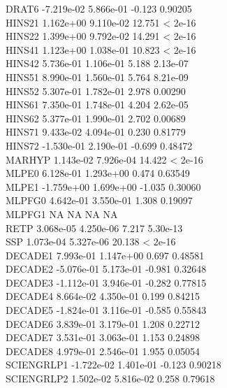 \documentclass[12pt]{article}
\begin{document}
DRAT6       -7.219e-02  5.866e-01  -0.123  0.90205\\
HINS21       1.162e+00  9.110e-02  12.751  < 2e-16\\
HINS22       1.399e+00  9.792e-02  14.291  < 2e-16\\
HINS41       1.123e+00  1.038e-01  10.823  < 2e-16\\
HINS42       5.736e-01  1.106e-01   5.188 2.13e-07\\
HINS51       8.990e-01  1.560e-01   5.764 8.21e-09\\
HINS52       5.307e-01  1.782e-01   2.978  0.00290\\
HINS61       7.350e-01  1.748e-01   4.204 2.62e-05\\
HINS62       5.377e-01  1.990e-01   2.702  0.00689\\
HINS71       9.433e-02  4.094e-01   0.230  0.81779\\
HINS72      -1.530e-01  2.190e-01  -0.699  0.48472\\
MARHYP       1.143e-02  7.926e-04  14.422  < 2e-16\\
MLPE0        6.128e-01  1.293e+00   0.474  0.63549\\
MLPE1       -1.759e+00  1.699e+00  -1.035  0.30060\\
MLPFG0       4.642e-01  3.550e-01   1.308  0.19097\\
MLPFG1              NA         NA      NA       NA\\
RETP         3.068e-05  4.250e-06   7.217 5.30e-13\\
SSP          1.073e-04  5.327e-06  20.138  < 2e-16\\
DECADE1      7.993e-01  1.147e+00   0.697  0.48581\\
DECADE2     -5.076e-01  5.173e-01  -0.981  0.32648\\
DECADE3     -1.112e-01  3.946e-01  -0.282  0.77815\\
DECADE4      8.664e-02  4.350e-01   0.199  0.84215\\
DECADE5     -1.824e-01  3.116e-01  -0.585  0.55843\\
DECADE6      3.839e-01  3.179e-01   1.208  0.22712\\
DECADE7      3.531e-01  3.063e-01   1.153  0.24898\\
DECADE8      4.979e-01  2.546e-01   1.955  0.05054\\
SCIENGRLP1  -1.722e-02  1.401e-01  -0.123  0.90218\\
SCIENGRLP2   1.502e-02  5.816e-02   0.258  0.79618\\
\end{document}
